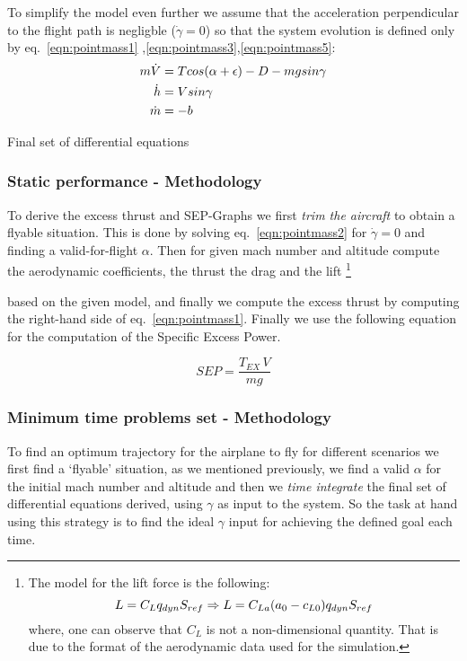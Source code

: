 \noindent To simplify the model even further we assume that the acceleration perpendicular to
the flight path is negligble ($\dot{\gamma} = 0$) so that the system evolution is defined only by eq.~\ref{eqn:pointmass1}
,\ref{eqn:pointmass3},\ref{eqn:pointmass5}:
\begin{align}
    m\dot{V}&= Tcos(\alpha + \epsilon) - D - mgsin\gamma  \notag\\
    \dot{h} &= Vsin\gamma \notag\\
    \dot{m} &= -b \notag
\end{align}
\begin{center}Final set of differential equations\end{center}



\subsubsection{Static performance - Methodology}

To derive the excess thrust and SEP-Graphs we first \textit{trim the aircraft} 
to obtain a flyable situation. This is done by solving eq.~\ref{eqn:pointmass2} 
for $\dot{\gamma} = 0$ and finding a valid-for-flight $\alpha$. Then for given 
mach number and altitude compute the aerodynamic coefficients, the thrust the drag
and the lift
\footnote{
The model for the lift force is the following:
\begin{equation}
    L = C_Lq_{dyn}S_{ref} \Rightarrow L = C_{La}(a_0 - c_{L0})q_{dyn}S_{ref}\notag
\end{equation}
where, one can observe that $C_L$ is not a non-dimensional quantity. That is due 
to the format of the aerodynamic data used for the simulation.
}

based on the given model, and finally we compute the excess thrust 
by computing the right-hand side of eq.~\ref{eqn:pointmass1}. Finally we use the following
equation for the computation of the Specific Excess Power.

\begin{equation}
    SEP = \frac{T_{EX}\,V}{mg}
    \label{eqn:SEP}
\end{equation}

%
%

\subsubsection{Minimum time problems set - Methodology}
To find an optimum trajectory for the airplane to fly for different scenarios we
first find a `flyable' situation, as we mentioned previously, we find a valid $\alpha$
for the initial mach number and altitude and then we \textit{time integrate} the final set of 
differential equations derived, using $\gamma$ as input to the system. 
So the task at hand using this strategy is to find the ideal $\gamma$ input for 
achieving the defined goal each time.




